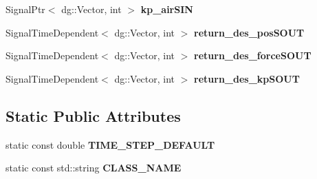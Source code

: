\begin{DoxyCompactItemize}
\item 
Signal\+Ptr$<$ dg\+::\+Vector, int $>$ {\bfseries kp\+\_\+air\+S\+IN}\hypertarget{classdynamicgraph_1_1sot_1_1PowerJumpControl_af871c1aec159c961bfd93f7eb39b98f3}{}\label{classdynamicgraph_1_1sot_1_1PowerJumpControl_af871c1aec159c961bfd93f7eb39b98f3}

\item 
Signal\+Time\+Dependent$<$ dg\+::\+Vector, int $>$ {\bfseries return\+\_\+des\+\_\+pos\+S\+O\+UT}\hypertarget{classdynamicgraph_1_1sot_1_1PowerJumpControl_a5613880b3676a473dab4c970423132b0}{}\label{classdynamicgraph_1_1sot_1_1PowerJumpControl_a5613880b3676a473dab4c970423132b0}

\item 
Signal\+Time\+Dependent$<$ dg\+::\+Vector, int $>$ {\bfseries return\+\_\+des\+\_\+force\+S\+O\+UT}\hypertarget{classdynamicgraph_1_1sot_1_1PowerJumpControl_a52b5f90b8013acf3d41c9afc6849eb96}{}\label{classdynamicgraph_1_1sot_1_1PowerJumpControl_a52b5f90b8013acf3d41c9afc6849eb96}

\item 
Signal\+Time\+Dependent$<$ dg\+::\+Vector, int $>$ {\bfseries return\+\_\+des\+\_\+kp\+S\+O\+UT}\hypertarget{classdynamicgraph_1_1sot_1_1PowerJumpControl_a6403ae6d5d835ac513fbfa90de7f66a0}{}\label{classdynamicgraph_1_1sot_1_1PowerJumpControl_a6403ae6d5d835ac513fbfa90de7f66a0}

\end{DoxyCompactItemize}
\subsection*{Static Public Attributes}
\begin{DoxyCompactItemize}
\item 
static const double {\bfseries T\+I\+M\+E\+\_\+\+S\+T\+E\+P\+\_\+\+D\+E\+F\+A\+U\+LT}\hypertarget{classdynamicgraph_1_1sot_1_1PowerJumpControl_aca39789e27aa56bf6f820bbe92c89422}{}\label{classdynamicgraph_1_1sot_1_1PowerJumpControl_aca39789e27aa56bf6f820bbe92c89422}

\item 
static const std\+::string {\bfseries C\+L\+A\+S\+S\+\_\+\+N\+A\+ME}\hypertarget{classdynamicgraph_1_1sot_1_1PowerJumpControl_a4cfb045d8bedf64bf0b15801fa66c848}{}\label{classdynamicgraph_1_1sot_1_1PowerJumpControl_a4cfb045d8bedf64bf0b15801fa66c848}

\end{DoxyCompactItemize}
